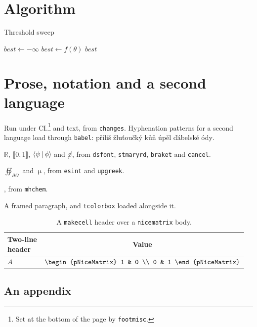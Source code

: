 \documentclass[11pt]{article}
\begin{document}
\section{Algorithm}

\begin{algorithm}[H]
  \caption{Threshold sweep}
  \begin{algorithmic}[1]
    \State $best \gets -\infty$
    \For{$\theta \in \Theta$}
       \State $best \gets f(\theta)$ \EndIf
    \EndFor
    \State \Return $best$
  \end{algorithmic}
\end{algorithm}

\section{Prose, notation and a second language}

\begin{acronym}
\end{acronym}

Run under \ac{CI}.\footnote{Set at the bottom of the page by \texttt{footmisc}.}
 and  text, from \texttt{changes}.
Hyphenation patterns for a second language load through \texttt{babel}:
\foreignlanguage{czech}{příliš žluťoučký kůň úpěl ďábelské ódy}.

\begin{compactitem}
  \item $\mathds{R}$, $\llbracket 0,1 \rrbracket$, $\Braket{\psi | \phi}$ and
        $\cancel{x}$, from \texttt{dsfont}, \texttt{stmaryrd},
        \texttt{braket} and \texttt{cancel}.
  \item $\oiint_{\partial\Omega}$ and $\upmu$, from \texttt{esint} and
        \texttt{upgreek}.
  \item {}, from \texttt{mhchem}.
\end{compactitem}

\begin{framed}
  \noindent A framed paragraph, and \texttt{tcolorbox} loaded alongside it.
\end{framed}

\begin{table}[H]
  \centering
  \caption{A \texttt{makecell} header over a \texttt{nicematrix} body.}
  \begin{tabular}{lc}
    \toprule
    \makecell{Two-line\\header} & Value \\
    \midrule
    $A$ & $\begin{pNiceMatrix} 1 & 0 \\ 0 & 1 \end{pNiceMatrix}$ \\
    \bottomrule
  \end{tabular}
\end{table}




\begin{appendices}
\section{An appendix}
\lipsum[1][1-3]
\end{appendices}
\end{document}
